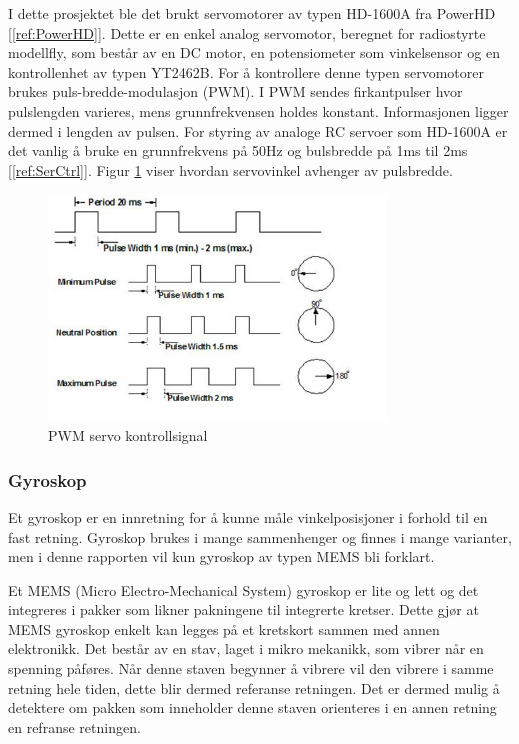 I dette prosjektet ble det brukt servomotorer av typen HD-1600A fra PowerHD [\ref{ref:PowerHD}]. Dette er en enkel analog servomotor, beregnet for radiostyrte modellfly, som består av en DC motor, en potensiometer som vinkelsensor og en kontrollenhet av typen YT2462B. For å kontrollere denne typen servomotorer brukes puls-bredde-modulasjon (PWM). I PWM sendes firkantpulser hvor pulslengden varieres, mens grunnfrekvensen holdes konstant. Informasjonen ligger dermed i lengden av pulsen. For styring av analoge RC servoer som HD-1600A er det vanlig å bruke en grunnfrekvens på 50Hz og bulsbredde på 1ms til 2ms [\ref{ref:SerCtrl}]. Figur \ref{fig:PWM} viser hvordan servovinkel avhenger av pulsbredde.

\begin{figure}[H]
\centering
\includegraphics[width=0.8\textwidth]{img/pwm_servo.jpg}
\caption{PWM servo kontrollsignal}
\label{fig:PWM}
\end{figure}   


\subsubsection{Gyroskop}
Et gyroskop er en innretning for å kunne måle vinkelposisjoner i forhold til en fast retning. Gyroskop brukes i mange sammenhenger og finnes i mange varianter, men i denne rapporten vil kun gyroskop av typen MEMS bli forklart. 

Et MEMS (Micro Electro-Mechanical System) gyroskop er lite og lett og det integreres i pakker som likner pakningene til integrerte kretser. Dette gjør at MEMS gyroskop enkelt kan legges på et kretskort sammen med annen elektronikk. Det består av en stav, laget i mikro mekanikk, som vibrer når en spenning påføres. Når denne staven begynner å vibrere vil den vibrere i samme retning hele tiden, dette blir dermed referanse retningen.  Det er dermed mulig å detektere om pakken som inneholder denne staven orienteres i en annen retning en refranse retningen. 

